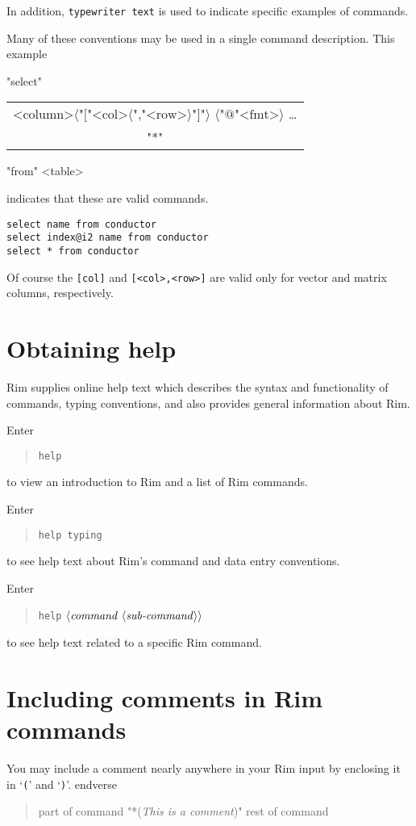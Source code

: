 \documentclass[11pt,a4paper]{report}
\def\opt#1{$\langle \mbox{#1} \rangle$}
\def\stk#1{\begin{tabular}[c]{c}#1\end{tabular}}
\def\I{\index}
\begin{document}
In addition, {\tt typewriter text} is used to indicate specific
examples of commands.
 
Many of these conventions may be used in a single command description.
This example

"select" \stk{<column>\opt{"["<col>\opt{","<row>}"]"}%
          \opt{"@"<fmt>} \ldots \\
             "*"}
     "from" <table>

indicates that these are valid commands.
 
\begin{verbatim}
select name from conductor
select index@i2 name from conductor
select * from conductor
\end{verbatim}
 
Of course the \verb![col]! and
\verb![<col>,<row>]! are valid only for vector and matrix
columns, respectively.
 
 
\section{Obtaining help}
\I{help@"help"}
Rim supplies online help text which describes the
syntax and functionality of commands,
 typing conventions, and also provides general information about Rim.

Enter
\begin{verse}
\verb!help!
\end{verse}

to view an introduction to Rim and a list of Rim commands.

Enter
\begin{verse}
\verb!help typing!
\end{verse}
to see help text about Rim's command and data entry conventions.

Enter
\begin{verse}
\verb!help! \opt{\emph{command} \opt{\emph{sub-command}}}
\end{verse}
to see help text related to a specific Rim command.
 
\section{Including comments in Rim commands}
%
\I{comments}
You may include a comment nearly anywhere in your Rim input
by enclosing it in `{\tt*(}' and `{\tt )}'.
end{verse}
\begin{verse}
part of command  "*({\em This is a comment})"  rest of command
\end{verse}
\end{document}
